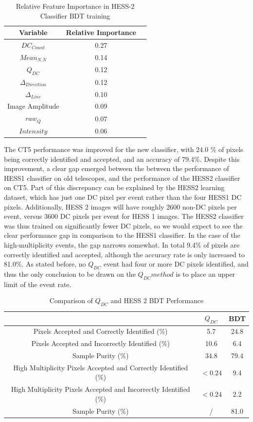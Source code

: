 \documentclass{article}
\begin{document}
\begin{table}[h!]
  \centering
  \caption{Relative Feature Importance in HESS-2 Classifier BDT training}
  \label{tab:hess2classifier}
  \begin{tabular}{ccc}
    \toprule
    Variable & Relative Importance\\
    \midrule
    $DC_{Count}$ & 0.27\\
    $Mean_{N.N}$ & 0.14\\
    $Q_{DC}$ & 0.12\\
    $\Delta_{Direction}$ & 0.12\\
    $\Delta_{Line}$ & 0.10\\
    Image Amplitude & 0.09\\
    $raw_{Q}$ & 0.07\\
    $Intensity$ & 0.06\\
    \bottomrule
  \end{tabular}
\end{table}

The CT5 performance was improved for the new classifier, with 24.0 \% of pixels being correctly identified and accepted, and an accuracy of 79.4\%. Despite this improvement, a clear gap emerged between the between the performance of HESS1 classifier on old telescopes, and the performance of the HESS2 classifier on CT5. Part of this discrepancy can be explained by the HESS2 learning dataset, which has just one DC pixel per event rather than the four HESS1 DC pixels. Additionally, HESS 2 images will have roughly 2600 non-DC pixels per event, versus 3600 DC pixels per event for HESS 1 images. The HESS2 classifier was thus trained on significantly fewer DC pixels, so we would expect to see the clear performance gap in comparison to the HESS1 classifier. In the case of the high-multiplicity events, the gap narrows somewhat. In total 9.4\% of pixels are correctly identified and accepted, although the accuracy rate is only increased to 81.0\%. As stated before, no $Q_{DC}$ event had four or more DC pixels identified, and thus the only conclusion to be drawn on the $Q_{DC} method$ is to place an upper limit of the event rate. 

\begin{table}[h!]
  \centering
  \caption{Comparison of $Q_{DC}$ and HESS 2 BDT Performance}
  \label{tab:qdcbdtcomparison2}
  \begin{tabular}{ccc}
    \toprule
    & $Q_{DC}$ & BDT\\
    \midrule
    Pixels Accepted and Correctly Identified (\%) & 5.7 & 24.8\\
   Pixels Accepted and Incorrectly Identified (\%) & 10.6 & 6.4\\
    Sample Purity (\%) & 34.8 & 79.4 \\
    \midrule
    High Multiplicity Pixels Accepted and Correctly Identified (\%) & $<0.24$ & 9.4\\
    High Multiplicity Pixels Accepted and Incorrectly Identified (\%) & $<0.24$ & 2.2\\
    Sample Purity (\%) & / & 81.0\\
    \bottomrule
  \end{tabular}
\end{table}
\end{document}
